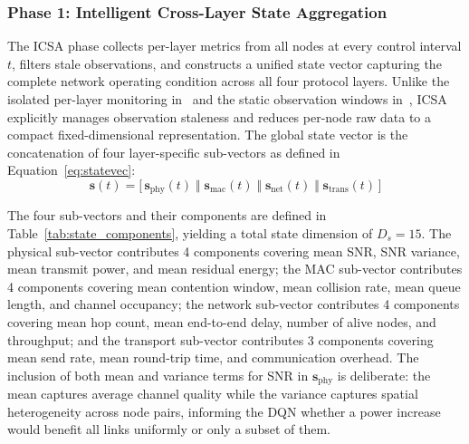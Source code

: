 \documentclass[a4paper]{cas-dc}
\numberwithin{equation}{section}
\begin{document}
\subsubsection{Phase 1: Intelligent Cross-Layer State Aggregation}
\label{subsubsec:phase1}

The ICSA phase collects per-layer metrics from all nodes at every control interval $t$, filters stale observations, and constructs a unified state vector capturing the complete network operating condition across all four protocol layers. Unlike the isolated per-layer monitoring in~\cite{Bhushan2025} and the static observation windows in~\cite{Hu2025}, ICSA explicitly manages observation staleness and reduces per-node raw data to a compact fixed-dimensional representation. The global state vector is the concatenation of four layer-specific sub-vectors as defined in Equation~\ref{eq:statevec}:
\begin{equation}
\label{eq:statevec}
\mathbf{s}(t) =
  \bigl[\,\mathbf{s}_{\text{phy}}(t)\;\Vert\;
          \mathbf{s}_{\text{mac}}(t)\;\Vert\;
          \mathbf{s}_{\text{net}}(t)\;\Vert\;
          \mathbf{s}_{\text{trans}}(t)\,\bigr]
\end{equation}

The four sub-vectors and their components are defined in Table~\ref{tab:state_components}, yielding a total state dimension of $D_s = 15$. The physical sub-vector contributes 4 components covering mean SNR, SNR variance, mean transmit power, and mean residual energy; the MAC sub-vector contributes 4 components covering mean contention window, mean collision rate, mean queue length, and channel occupancy; the network sub-vector contributes 4 components covering mean hop count, mean end-to-end delay, number of alive nodes, and throughput; and the transport sub-vector contributes 3 components covering mean send rate, mean round-trip time, and communication overhead. The inclusion of both mean and variance terms for SNR in $\mathbf{s}_{\text{phy}}$ is deliberate: the mean captures average channel quality while the variance captures spatial heterogeneity across node pairs, informing the DQN whether a power increase would benefit all links uniformly or only a subset of them.
\end{document}
